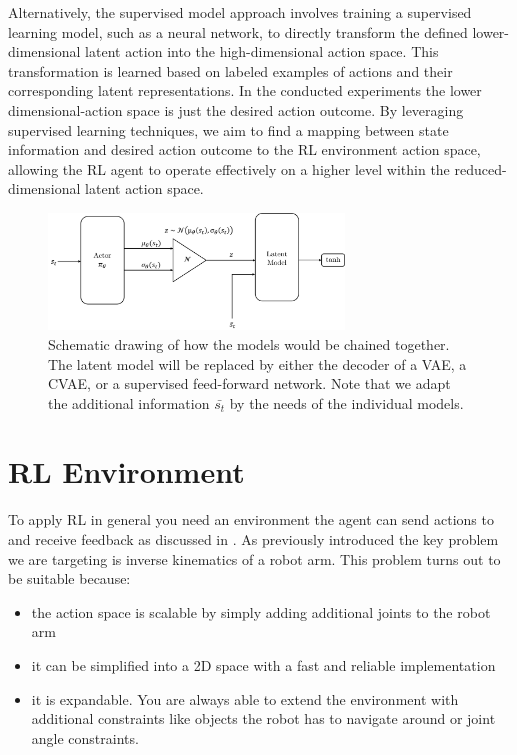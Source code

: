 Alternatively, the supervised model approach involves training a supervised learning model, such as a neural network, to directly transform the defined lower-dimensional latent action into the high-dimensional action space. This transformation is learned based on labeled examples of actions and their corresponding latent representations. In the conducted experiments the lower dimensional-action space is just the desired action outcome. By leveraging supervised learning techniques, we aim to find a mapping between state information and desired action outcome to the RL environment action space, allowing the RL agent to operate effectively on a higher level within the reduced-dimensional latent action space.
\begin{figure}
    \centering
    \includegraphics[width=0.7\textwidth,]{figures/methodology/SAC+LatentModel.png}
    \caption[Research idea]{Schematic drawing of how the models would be chained together. The latent model will be replaced by either the decoder of a VAE, a CVAE, or a supervised feed-forward network. Note that we adapt the additional information $\bar{s_t}$ by the needs of the individual models. }
    \label{fig:research_idea}
\end{figure}

\section{RL Environment}\label{sec:RL-Environment}

To apply RL in general you need an environment the agent can send actions to and receive feedback as discussed in . As previously introduced the key problem we are targeting is inverse kinematics of a robot arm. This problem turns out to be suitable because:
\begin{itemize}
    \item the action space is scalable by simply adding additional joints to the robot arm
    \item it can be simplified into a 2D space with a fast and reliable implementation
    \item it is expandable. You are always able to extend the environment with additional constraints like objects the robot has to navigate around or joint angle constraints.
\end{itemize}

